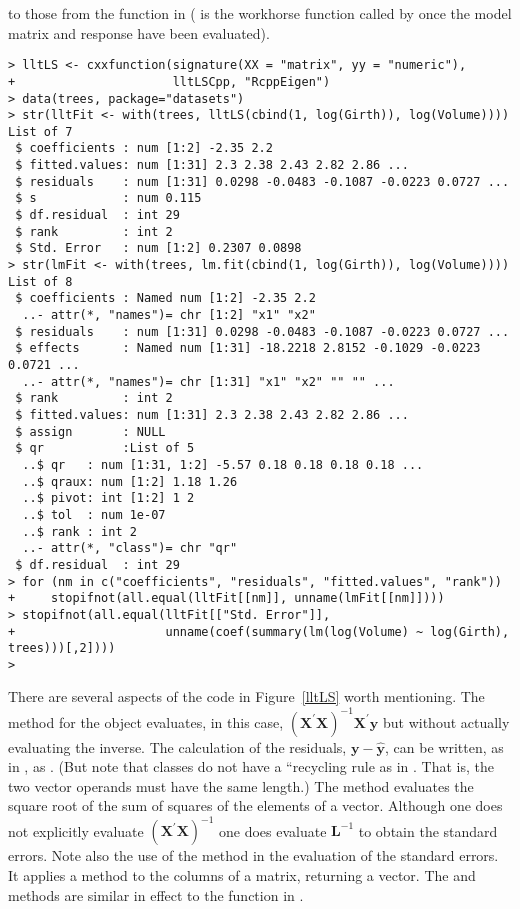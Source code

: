 \documentclass[shortnames,article]{jss}
\begin{document}
to those from the  function in 
( is the workhorse function called by  once the
model matrix and response have been evaluated).
\begin{verbatim}
> lltLS <- cxxfunction(signature(XX = "matrix", yy = "numeric"), 
+                      lltLSCpp, "RcppEigen")
> data(trees, package="datasets")
> str(lltFit <- with(trees, lltLS(cbind(1, log(Girth)), log(Volume))))
List of 7
 $ coefficients : num [1:2] -2.35 2.2
 $ fitted.values: num [1:31] 2.3 2.38 2.43 2.82 2.86 ...
 $ residuals    : num [1:31] 0.0298 -0.0483 -0.1087 -0.0223 0.0727 ...
 $ s            : num 0.115
 $ df.residual  : int 29
 $ rank         : int 2
 $ Std. Error   : num [1:2] 0.2307 0.0898
> str(lmFit <- with(trees, lm.fit(cbind(1, log(Girth)), log(Volume))))
List of 8
 $ coefficients : Named num [1:2] -2.35 2.2
  ..- attr(*, "names")= chr [1:2] "x1" "x2"
 $ residuals    : num [1:31] 0.0298 -0.0483 -0.1087 -0.0223 0.0727 ...
 $ effects      : Named num [1:31] -18.2218 2.8152 -0.1029 -0.0223 0.0721 ...
  ..- attr(*, "names")= chr [1:31] "x1" "x2" "" "" ...
 $ rank         : int 2
 $ fitted.values: num [1:31] 2.3 2.38 2.43 2.82 2.86 ...
 $ assign       : NULL
 $ qr           :List of 5
  ..$ qr   : num [1:31, 1:2] -5.57 0.18 0.18 0.18 0.18 ...
  ..$ qraux: num [1:2] 1.18 1.26
  ..$ pivot: int [1:2] 1 2
  ..$ tol  : num 1e-07
  ..$ rank : int 2
  ..- attr(*, "class")= chr "qr"
 $ df.residual  : int 29
> for (nm in c("coefficients", "residuals", "fitted.values", "rank"))
+     stopifnot(all.equal(lltFit[[nm]], unname(lmFit[[nm]])))
> stopifnot(all.equal(lltFit[["Std. Error"]],
+                     unname(coef(summary(lm(log(Volume) ~ log(Girth), trees)))[,2])))
> 
\end{verbatim}


There are several aspects of the  code in
Figure~\ref{lltLS} worth mentioning.  The  method for the
 object evaluates, in this case, $\left(\bm X^\prime\bm
  X\right)^{-1}\bm X^\prime\bm y$ but without actually evaluating the
inverse.  The calculation of the residuals, $\bm y-\widehat{\bm y}$,
can be written, as in , as . (But note
that  classes do not have a ``recycling rule as in
.  That is, the two vector operands must have the same
length.)  The  method evaluates the square root of the
sum of squares of the elements of a vector.  Although one does not
explicitly evaluate $\left(\bm X^\prime\bm X\right)^{-1}$ one does
evaluate $\bm L^{-1}$ to obtain the standard errors.  Note also the
use of the  method in the evaluation of the standard
errors.  It applies a method to the columns of a matrix, returning a
vector.  The   and  methods
are similar in effect to the  function in .
\end{document}
